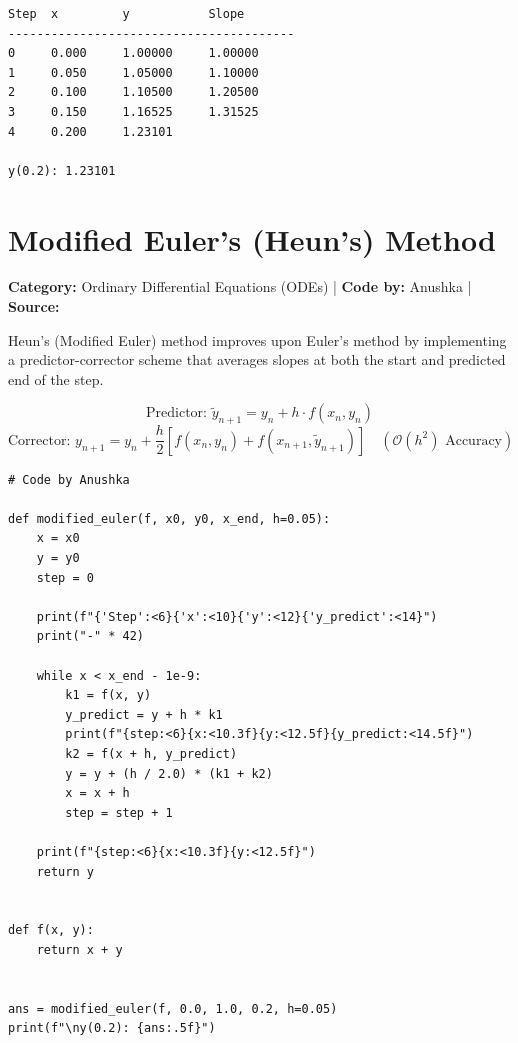 \documentclass[10pt,a4paper]{report}
\begin{document}
\begin{tcolorbox}[colback=termbg,colframe=primary,title=\textbf{Program Execution Output \& Convergence Table},boxrule=1pt,arc=2mm]
\begin{lstlisting}[style=terminal_output]
Step  x         y           Slope       
----------------------------------------
0     0.000     1.00000     1.00000     
1     0.050     1.05000     1.10000     
2     0.100     1.10500     1.20500     
3     0.150     1.16525     1.31525     
4     0.200     1.23101     

y(0.2): 1.23101
\end{lstlisting}
\end{tcolorbox}

\newpage

\section{Modified Euler's (Heun's) Method}
\textbf{Category:} \textcolor{secondary}{Ordinary Differential Equations (ODEs)} \quad | \quad \textbf{Code by:} \textcolor{secondary}{Anushka} \quad | \quad \textbf{Source:} \texttt{}

Heun's (Modified Euler) method improves upon Euler's method by implementing a predictor-corrector scheme that averages slopes at both the start and predicted end of the step.

\begin{tcolorbox}[colback=theorybg,colframe=theoryframe,title=\textbf{Mathematical Theory \& Formulation},boxrule=1pt,arc=2mm]
\[
\text{Predictor: } \tilde{y}_{n+1} = y_n + h \cdot f(x_n, y_n)
\]
\[
\text{Corrector: } y_{n+1} = y_n + \frac{h}{2}\left[f(x_n, y_n) + f(x_{n+1}, \tilde{y}_{n+1})\right] \quad (\mathcal{O}(h^2) \text{ Accuracy})
\]
\end{tcolorbox}

\begin{tcolorbox}[colback=codebg,colframe=secondary,title=\textbf{Python Implementation (Step-by-Step Loops \& Pure Functions)},boxrule=1pt,arc=2mm]
\begin{lstlisting}[style=python_detailed]
# Code by Anushka

def modified_euler(f, x0, y0, x_end, h=0.05):
    x = x0
    y = y0
    step = 0

    print(f"{'Step':<6}{'x':<10}{'y':<12}{'y_predict':<14}")
    print("-" * 42)

    while x < x_end - 1e-9:
        k1 = f(x, y)
        y_predict = y + h * k1
        print(f"{step:<6}{x:<10.3f}{y:<12.5f}{y_predict:<14.5f}")
        k2 = f(x + h, y_predict)
        y = y + (h / 2.0) * (k1 + k2)
        x = x + h
        step = step + 1

    print(f"{step:<6}{x:<10.3f}{y:<12.5f}")
    return y


def f(x, y):
    return x + y


ans = modified_euler(f, 0.0, 1.0, 0.2, h=0.05)
print(f"\ny(0.2): {ans:.5f}")

\end{lstlisting}
\end{tcolorbox}
\end{document}
